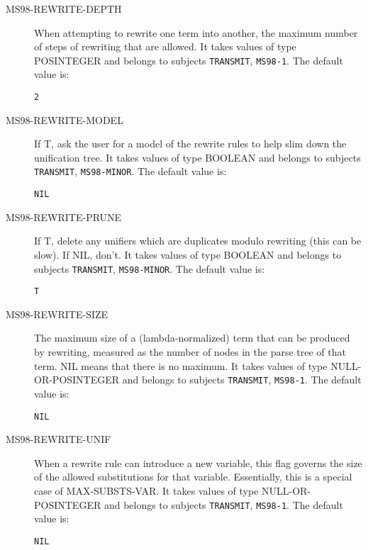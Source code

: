 \begin{description}
\item[MS98-REWRITE-DEPTH]  
When attempting to rewrite one term into another,
the maximum number of steps of rewriting that are allowed.
It takes values of type POSINTEGER and belongs to subjects \texttt{TRANSMIT}, \texttt{MS98-1}.  The default value is: \begin{lstlisting}
2
\end{lstlisting}

\item[MS98-REWRITE-MODEL]  
If T, ask the user for a model of the rewrite rules
to help slim down the unification tree.
It takes values of type BOOLEAN and belongs to subjects \texttt{TRANSMIT}, \texttt{MS98-MINOR}.  The default value is: \begin{lstlisting}
NIL
\end{lstlisting}

\item[MS98-REWRITE-PRUNE]  
If T, delete any unifiers which are duplicates modulo
rewriting (this can be slow). If NIL, don't.
It takes values of type BOOLEAN and belongs to subjects \texttt{TRANSMIT}, \texttt{MS98-MINOR}.  The default value is: \begin{lstlisting}
T
\end{lstlisting}

\item[MS98-REWRITE-SIZE]  
The maximum size of a (lambda-normalized) term that can be 
produced by rewriting, measured as the number of nodes in the parse
tree of that term. NIL means that there is no maximum.
It takes values of type NULL-OR-POSINTEGER and belongs to subjects \texttt{TRANSMIT}, \texttt{MS98-1}.  The default value is: \begin{lstlisting}
NIL
\end{lstlisting}

\item[MS98-REWRITE-UNIF]  
When a rewrite rule can introduce a new variable, this
flag governs the size of the allowed substitutions for that
variable. Essentially, this is a special case of MAX-SUBSTS-VAR.
It takes values of type NULL-OR-POSINTEGER and belongs to subjects \texttt{TRANSMIT}, \texttt{MS98-1}.  The default value is: \begin{lstlisting}
NIL
\end{lstlisting}


\end{description}
